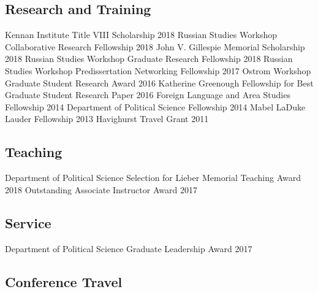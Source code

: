 \documentclass[11pt,]{article}
\begin{document}
\hypertarget{research-and-training}{%
\subsection{Research and Training}\label{research-and-training}}

Kennan Institute Title VIII Scholarship \hfill 2018 \newline Russian
Studies Workshop Collaborative Research Fellowship \hfill 2018 \newline
John V. Gillespie Memorial Scholarship \hfill 2018 \newline Russian
Studies Workshop Graduate Research Fellowship \hfill 2018 \newline
Russian Studies Workshop Predissertation Networking Fellowship
\hfill 2017 \newline Ostrom Workshop Graduate Student Research Award
\hfill 2016 \newline Katherine Greenough Fellowship for Best Graduate
Student Research Paper \hfill 2016 \newline Foreign Language and Area
Studies Fellowship \hfill 2014 \newline Department of Political Science
Fellowship \hfill 2014 \newline Mabel LaDuke Lauder Fellowship
\hfill 2013 \newline Havighurst Travel Grant \hfill 2011

\hypertarget{teaching}{%
\subsection{Teaching}\label{teaching}}

Department of Political Science Selection for Lieber Memorial Teaching
Award \hfill 2018 \newline Outstanding Associate Instructor Award
\hfill 2017

\hypertarget{service}{%
\subsection{Service}\label{service}}

Department of Political Science Graduate Leadership Award \hfill 2017

\hypertarget{conference-travel}{%
\subsection{Conference Travel}\label{conference-travel}}
\end{document}
